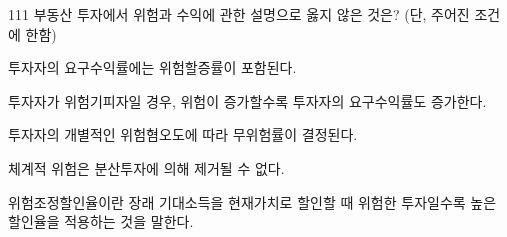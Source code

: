 \begin{question}{111}
부동산 투자에서 위험과 수익에 관한 설명으로 옳지 않은 것은? (단, 주어진 조건에 한함)
\begin{choices}
  \item 투자자의 요구수익률에는 위험할증률이 포함된다.
  \item 투자자가 위험기피자일 경우, 위험이 증가할수록 투자자의 요구수익률도 증가한다.
  \item 투자자의 개별적인 위험혐오도에 따라 무위험률이 결정된다.
  \item 체계적 위험은 분산투자에 의해 제거될 수 없다.
  \item 위험조정할인율이란 장래 기대소득을 현재가치로 할인할 때 위험한 투자일수록 높은 할인율을 적용하는 것을 말한다.
\end{choices}
\end{question}

